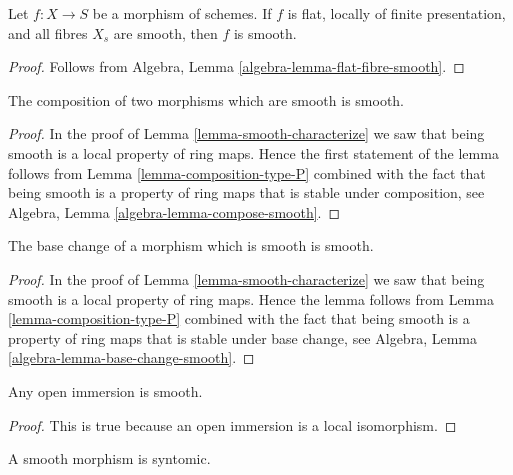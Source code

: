 \begin{lemma}
\label{lemma-smooth-flat-smooth-fibres}
Let $f : X \to S$ be a morphism of schemes.
If $f$ is flat, locally of finite presentation, and all
fibres $X_s$ are smooth, then $f$
is smooth.
\end{lemma}

\begin{proof}
Follows from Algebra, Lemma \ref{algebra-lemma-flat-fibre-smooth}.
\end{proof}


\begin{lemma}
\label{lemma-composition-smooth}
The composition of two morphisms which are smooth is smooth.
\end{lemma}

\begin{proof}
In the proof of Lemma \ref{lemma-smooth-characterize}
we saw that being smooth is a local property of ring maps.
Hence the first statement of the lemma follows from
Lemma \ref{lemma-composition-type-P} combined
with the fact that being smooth is a property of ring maps that is
stable under composition, see
Algebra, Lemma \ref{algebra-lemma-compose-smooth}.
\end{proof}

\begin{lemma}
\label{lemma-base-change-smooth}
The base change of a morphism which is smooth is smooth.
\end{lemma}

\begin{proof}
In the proof of Lemma \ref{lemma-smooth-characterize}
we saw that being smooth is a local property of ring maps.
Hence the lemma follows from
Lemma \ref{lemma-composition-type-P} combined
with the fact that being smooth is a property of ring maps that is
stable under base change, see
Algebra, Lemma \ref{algebra-lemma-base-change-smooth}.
\end{proof}

\begin{lemma}
\label{lemma-open-immersion-smooth}
Any open immersion is smooth.
\end{lemma}

\begin{proof}
This is true because an open immersion is a local isomorphism.
\end{proof}

\begin{lemma}
\label{lemma-smooth-syntomic}
A smooth morphism is syntomic.
\end{lemma}

